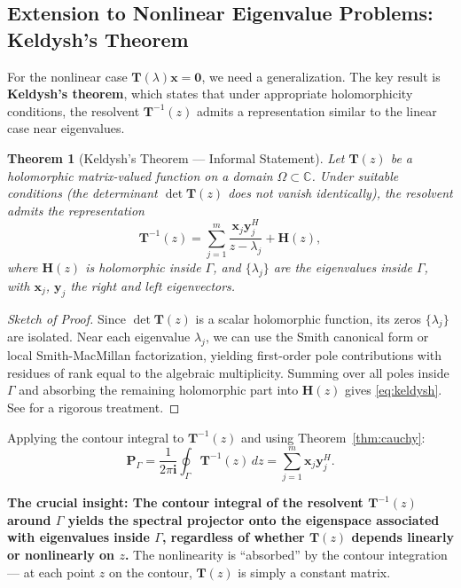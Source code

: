 \documentclass[12pt,a4paper]{article}
\newtheorem{theorem}{Theorem}[section]
\theoremstyle{definition}
\newcommand{\key}[1]{\textcolor{keypoint}{\textbf{#1}}}
\begin{document}
\subsection{Extension to Nonlinear Eigenvalue Problems: Keldysh's Theorem}

For the nonlinear case $\mathbf{T}(\lambda)\mathbf{x} = \mathbf{0}$, we need a generalization. The key result is \textbf{Keldysh's theorem}, which states that under appropriate holomorphicity conditions, the resolvent $\mathbf{T}^{-1}(z)$ admits a representation similar to the linear case near eigenvalues.

\begin{theorem}[Keldysh's Theorem --- Informal Statement]\label{thm:keldysh}
Let $\mathbf{T}(z)$ be a holomorphic matrix-valued function on a domain $\Omega \subset \mathbb{C}$. Under suitable conditions (the determinant $\det\mathbf{T}(z)$ does not vanish identically), the resolvent admits the representation
\begin{equation}\label{eq:keldysh}
\mathbf{T}^{-1}(z) = \sum_{j=1}^{m} \frac{\mathbf{x}_j\mathbf{y}_j^{H}}{z - \lambda_j} + \mathbf{H}(z),
\end{equation}
where $\mathbf{H}(z)$ is holomorphic inside $\Gamma$, and $\{\lambda_j\}$ are the eigenvalues inside $\Gamma$, with $\mathbf{x}_j$, $\mathbf{y}_j$ the right and left eigenvectors.
\end{theorem}

\begin{proof}[Sketch of Proof]
Since $\det\mathbf{T}(z)$ is a scalar holomorphic function, its zeros $\{\lambda_j\}$ are isolated. Near each eigenvalue $\lambda_j$, we can use the Smith canonical form or local Smith-MacMillan factorization, yielding first-order pole contributions with residues of rank equal to the algebraic multiplicity. Summing over all poles inside $\Gamma$ and absorbing the remaining holomorphic part into $\mathbf{H}(z)$ gives \eqref{eq:keldysh}. See \cite{Beyn2012} for a rigorous treatment.
\end{proof}

Applying the contour integral to $\mathbf{T}^{-1}(z)$ and using Theorem~\ref{thm:cauchy}:
\begin{equation}\label{eq:nonlinear_projector}
\boxed{\mathbf{P}_{\Gamma} = \frac{1}{2\pi\mathbf{i}} \oint_{\Gamma} \mathbf{T}^{-1}(z)\,dz = \sum_{j=1}^{m} \mathbf{x}_j\mathbf{y}_j^{H}}.
\end{equation}

\key{The crucial insight: The contour integral of the resolvent $\mathbf{T}^{-1}(z)$ around $\Gamma$ yields the spectral projector onto the eigenspace associated with eigenvalues inside $\Gamma$, regardless of whether $\mathbf{T}(z)$ depends linearly or nonlinearly on $z$.} The nonlinearity is ``absorbed'' by the contour integration --- at each point $z$ on the contour, $\mathbf{T}(z)$ is simply a constant matrix.
\end{document}

